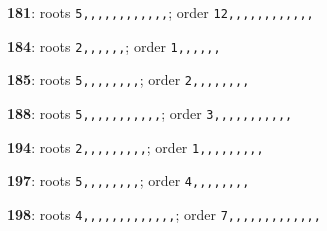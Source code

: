 \noindent \textbf{181}: roots \texttt{5,,,,,,,,,,,,}; order \texttt{12,,,,,,,,,,,,}\par
\noindent \textbf{184}: roots \texttt{2,,,,,,}; order \texttt{1,,,,,,}\par
\noindent \textbf{185}: roots \texttt{5,,,,,,,,}; order \texttt{2,,,,,,,,}\par
\noindent \textbf{188}: roots \texttt{5,,,,,,,,,,,}; order \texttt{3,,,,,,,,,,,}\par
\noindent \textbf{194}: roots \texttt{2,,,,,,,,,}; order \texttt{1,,,,,,,,,}\par
\noindent \textbf{197}: roots \texttt{5,,,,,,,,}; order \texttt{4,,,,,,,,}\par
\noindent \textbf{198}: roots \texttt{4,,,,,,,,,,,,,}; order \texttt{7,,,,,,,,,,,,,}\par
